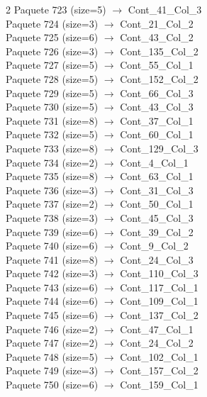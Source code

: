 \begin{multicols}{2}
Paquete 723 (size=5) $\rightarrow$ Cont\_41\_Col\_3\\
Paquete 724 (size=3) $\rightarrow$ Cont\_21\_Col\_2\\
Paquete 725 (size=6) $\rightarrow$ Cont\_43\_Col\_2\\
Paquete 726 (size=3) $\rightarrow$ Cont\_135\_Col\_2\\
Paquete 727 (size=5) $\rightarrow$ Cont\_55\_Col\_1\\
Paquete 728 (size=5) $\rightarrow$ Cont\_152\_Col\_2\\
Paquete 729 (size=5) $\rightarrow$ Cont\_66\_Col\_3\\
Paquete 730 (size=5) $\rightarrow$ Cont\_43\_Col\_3\\
Paquete 731 (size=8) $\rightarrow$ Cont\_37\_Col\_1\\
Paquete 732 (size=5) $\rightarrow$ Cont\_60\_Col\_1\\
Paquete 733 (size=8) $\rightarrow$ Cont\_129\_Col\_3\\
Paquete 734 (size=2) $\rightarrow$ Cont\_4\_Col\_1\\
Paquete 735 (size=8) $\rightarrow$ Cont\_63\_Col\_1\\
Paquete 736 (size=3) $\rightarrow$ Cont\_31\_Col\_3\\
Paquete 737 (size=2) $\rightarrow$ Cont\_50\_Col\_1\\
Paquete 738 (size=3) $\rightarrow$ Cont\_45\_Col\_3\\
Paquete 739 (size=6) $\rightarrow$ Cont\_39\_Col\_2\\
Paquete 740 (size=6) $\rightarrow$ Cont\_9\_Col\_2\\
Paquete 741 (size=8) $\rightarrow$ Cont\_24\_Col\_3\\
Paquete 742 (size=3) $\rightarrow$ Cont\_110\_Col\_3\\
Paquete 743 (size=6) $\rightarrow$ Cont\_117\_Col\_1\\
Paquete 744 (size=6) $\rightarrow$ Cont\_109\_Col\_1\\
Paquete 745 (size=6) $\rightarrow$ Cont\_137\_Col\_2\\
Paquete 746 (size=2) $\rightarrow$ Cont\_47\_Col\_1\\
Paquete 747 (size=2) $\rightarrow$ Cont\_24\_Col\_2\\
Paquete 748 (size=5) $\rightarrow$ Cont\_102\_Col\_1\\
Paquete 749 (size=3) $\rightarrow$ Cont\_157\_Col\_2\\
Paquete 750 (size=6) $\rightarrow$ Cont\_159\_Col\_1\\

\end{multicols}
